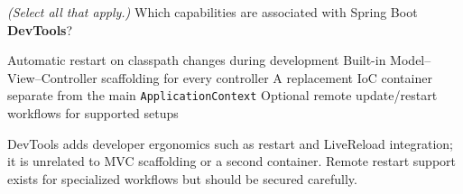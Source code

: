 \question[4]
\textit{(Select all that apply.)} Which capabilities are associated with Spring Boot \textbf{DevTools}?
\begin{checkboxes}
  \CorrectChoice Automatic restart on classpath changes during development
  \choice Built-in Model--View--Controller scaffolding for every controller
  \choice A replacement IoC container separate from the main \texttt{ApplicationContext}
  \CorrectChoice Optional remote update/restart workflows for supported setups
\end{checkboxes}
\begin{solution}
  DevTools adds developer ergonomics such as restart and LiveReload integration; it is unrelated to MVC scaffolding or a second container. Remote restart support exists for specialized workflows but should be secured carefully.
\end{solution}

